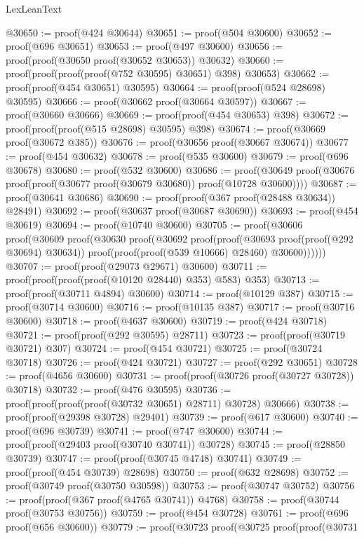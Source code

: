 \begin{lexlean}{LexLeanText}
\begin{coremodule}
@30650 := proof(@424 @30644)
@30651 := proof(@504 @30600)
@30652 := proof(@696 @30651)
@30653 := proof(@497 @30600)
@30656 := proof(proof(@30650 proof(@30652 @30653)) @30632)
@30660 := proof(proof(proof(proof(@752 @30595) @30651) @398) @30653)
@30662 := proof(proof(@454 @30651) @30595)
@30664 := proof(proof(@524 @28698) @30595)
@30666 := proof(@30662 proof(@30664 @30597))
@30667 := proof(@30660 @30666)
@30669 := proof(proof(@454 @30653) @398)
@30672 := proof(proof(proof(@515 @28698) @30595) @398)
@30674 := proof(@30669 proof(@30672 @385))
@30676 := proof(@30656 proof(@30667 @30674))
@30677 := proof(@454 @30632)
@30678 := proof(@535 @30600)
@30679 := proof(@696 @30678)
@30680 := proof(@532 @30600)
@30686 := proof(@30649 proof(@30676 proof(proof(@30677 proof(@30679 @30680)) proof(@10728 @30600))))
@30687 := proof(@30641 @30686)
@30690 := proof(proof(@367 proof(@28488 @30634)) @28491)
@30692 := proof(@30637 proof(@30687 @30690))
@30693 := proof(@454 @30619)
@30694 := proof(@10740 @30600)
@30705 := proof(@30606
      proof(@30609
          proof(@30630
              proof(@30692
                  proof(proof(@30693 proof(proof(@292 @30694) @30634))
                      proof(proof(proof(@539 @10666) @28460) @30600))))))
@30707 := proof(proof(@29073 @29671) @30600)
@30711 := proof(proof(proof(proof(@10120 @28440) @353) @583) @353)
@30713 := proof(proof(@30711 @4894) @30600)
@30714 := proof(@10129 @387)
@30715 := proof(@30714 @30600)
@30716 := proof(@10135 @387)
@30717 := proof(@30716 @30600)
@30718 := proof(@4637 @30600)
@30719 := proof(@424 @30718)
@30721 := proof(proof(@292 @30595) @28711)
@30723 := proof(proof(@30719 @30721) @307)
@30724 := proof(@454 @30721)
@30725 := proof(@30724 @30718)
@30726 := proof(@424 @30721)
@30727 := proof(@292 @30651)
@30728 := proof(@4656 @30600)
@30731 := proof(proof(@30726 proof(@30727 @30728)) @30718)
@30732 := proof(@476 @30595)
@30736 := proof(proof(proof(proof(@30732 @30651) @28711) @30728) @30666)
@30738 := proof(proof(@29398 @30728) @29401)
@30739 := proof(@617 @30600)
@30740 := proof(@696 @30739)
@30741 := proof(@747 @30600)
@30744 := proof(proof(@29403 proof(@30740 @30741)) @30728)
@30745 := proof(@28850 @30739)
@30747 := proof(proof(@30745 @4748) @30741)
@30749 := proof(proof(@454 @30739) @28698)
@30750 := proof(@632 @28698)
@30752 := proof(@30749 proof(@30750 @30598))
@30753 := proof(@30747 @30752)
@30756 := proof(proof(@367 proof(@4765 @30741)) @4768)
@30758 := proof(@30744 proof(@30753 @30756))
@30759 := proof(@454 @30728)
@30761 := proof(@696 proof(@656 @30600))
@30779 := proof(@30723
      proof(@30725
          proof(proof(@30731

\end{coremodule}
\end{lexlean}
